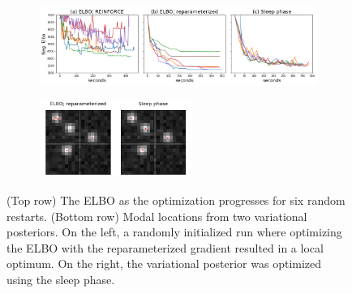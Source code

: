 \begin{figure}[!htb]
    \centering
    \begin{subfigure}[t]{0.9\textwidth}
    \centering
    \includegraphics[width=\textwidth]{figures/optim_path_compare.png}
    \end{subfigure}
    \begin{subfigure}[t]{\textwidth}
    \centering
    \includegraphics[width=0.55\textwidth]{figures/optim_path_detect_compare.png}
    \end{subfigure}
    \vspace{-3em}
    \caption{(Top row) The ELBO as the optimization progresses for six random restarts. 
    (Bottom row) Modal locations from two variational posteriors.
    On the left, a randomly initialized run where optimizing the ELBO with the reparameterized gradient resulted in a local optimum.
    On the right, the variational posterior 
    was optimized using the sleep phase. }
    \label{fig:optim_path}
\end{figure}


